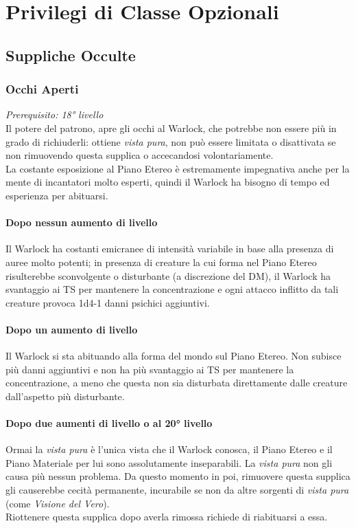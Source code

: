 
\section{Privilegi di Classe Opzionali}

\subsection{Suppliche Occulte}

\subsubsection{Occhi Aperti}
\textit{Prerequisito: 18° livello} \\ Il potere del patrono, apre gli occhi al Warlock, che potrebbe non essere più in grado di richiuderli: ottiene \textit{vista pura}, non può essere limitata o disattivata se non rimuovendo questa supplica o accecandosi volontariamente. \\
La costante esposizione al Piano Etereo è estremamente impegnativa anche per la mente di incantatori molto esperti, quindi il Warlock ha bisogno di tempo ed esperienza per abituarsi.
\paragraph{Dopo nessun aumento di livello}Il Warlock ha costanti emicranee di intensità variabile in base alla presenza di auree molto potenti; in presenza di creature la cui forma nel Piano Etereo risulterebbe sconvolgente o disturbante (a discrezione del DM), il Warlock ha svantaggio ai TS per mantenere la concentrazione e ogni attacco inflitto da tali creature provoca 1d4-1 danni psichici aggiuntivi.
\paragraph{Dopo un aumento di livello}Il Warlock si sta abituando alla forma del mondo sul Piano Etereo. Non subisce più danni aggiuntivi e non ha più svantaggio ai TS per mantenere la concentrazione, a meno che questa non sia disturbata direttamente dalle creature dall'aspetto più disturbante.
\paragraph{Dopo due aumenti di livello o al 20° livello} Ormai la \textit{vista pura} è l'unica vista che il Warlock conosca, il Piano Etereo e il Piano Materiale per lui sono assolutamente inseparabili. La \textit{vista pura} non gli causa più nessun problema. Da questo momento in poi, rimuovere questa supplica gli causerebbe cecità permanente, incurabile se non da altre sorgenti di \textit{vista pura} (come \textit{Visione del Vero}). \\
Riottenere questa supplica dopo averla rimossa richiede di riabituarsi a essa.

